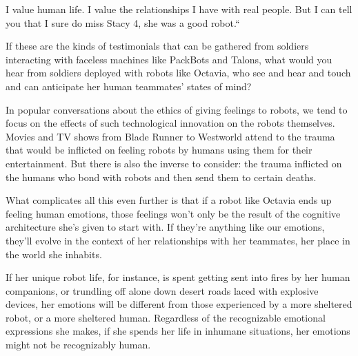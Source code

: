 \documentclass[9pt,a4paper]{extarticle}
\begin{document}
I value human life. I value the relationships I have with real people. But I can tell you that I sure do miss Stacy 4, she was a good robot.“

If these are the kinds of testimonials that can be gathered from soldiers interacting with faceless machines like PackBots and Talons, what would you hear from soldiers deployed with robots like Octavia, who see and hear and touch and can anticipate her human teammates’ states of mind?

In popular conversations about the ethics of giving feelings to robots, we tend to focus on the effects of such technological innovation on the robots themselves. Movies and TV shows from Blade Runner to Westworld attend to the trauma that would be inflicted on feeling robots by humans using them for their entertainment. But there is also the inverse to consider: the trauma inflicted on the humans who bond with robots and then send them to certain deaths.

What complicates all this even further is that if a robot like Octavia ends up feeling human emotions, those feelings won’t only be the result of the cognitive architecture she’s given to start with. If they’re anything like our emotions, they’ll evolve in the context of her relationships with her teammates, her place in the world she inhabits.

If her unique robot life, for instance, is spent getting sent into fires by her human companions, or trundling off alone down desert roads laced with explosive devices, her emotions will be different from those experienced by a more sheltered robot, or a more sheltered human. Regardless of the recognizable emotional expressions she makes, if she spends her life in inhumane situations, her emotions might not be recognizably human.
\end{document}
